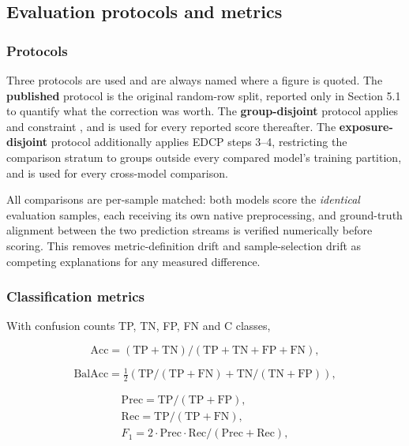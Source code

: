 \FloatBarrier

\subsection{Evaluation protocols and metrics}

\subsubsection{Protocols}

Three protocols are used and are always named where a figure is quoted. The \textbf{published} protocol is the original random-row split, reported only in Section 5.1 to quantify what the correction was worth. The \textbf{group-disjoint} protocol applies  and constraint , and is used for every reported score thereafter. The \textbf{exposure-disjoint} protocol additionally applies EDCP steps 3--4, restricting the comparison stratum to groups outside every compared model's training partition, and is used for every cross-model comparison.

All comparisons are per-sample matched: both models score the \emph{identical} evaluation samples, each receiving its own native preprocessing, and ground-truth alignment between the two prediction streams is verified numerically before scoring. This removes metric-definition drift and sample-selection drift as competing explanations for any measured difference.

\subsubsection{Classification metrics}

With confusion counts TP, TN, FP, FN and C classes,

\begin{equation}
\label{eq:140}
\mathrm{Acc} = ( \mathrm{TP} + \mathrm{TN} ) / ( \mathrm{TP} + \mathrm{TN} + \mathrm{FP} + \mathrm{FN} ),
\end{equation}

\begin{equation}
\label{eq:141}
\mathrm{BalAcc} = \tfrac{1}{2} ( \mathrm{TP}/(\mathrm{TP}+\mathrm{FN}) + \mathrm{TN}/(\mathrm{TN}+\mathrm{FP}) ),
\end{equation}

\begin{equation}
\label{eq:142}
\begin{aligned}
\mathrm{Prec} = \mathrm{TP}/(\mathrm{TP}+\mathrm{FP}), \\
\mathrm{Rec} = \mathrm{TP}/(\mathrm{TP}+\mathrm{FN}), \\
F_{1} = 2\cdot \mathrm{Prec}\cdot \mathrm{Rec}/(\mathrm{Prec}+\mathrm{Rec}),
\end{aligned}
\end{equation}

